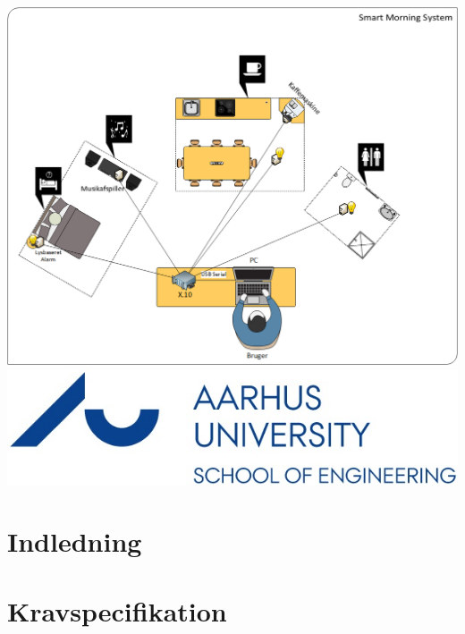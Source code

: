 \documentclass[11pt]{article}
\begin{document}
\begin{titlepage}
\includegraphics[scale=0.6]{projektillustration.png}\\[0.6cm]
\includegraphics[scale=0.25]{forsidelogo.jpg}\\[1cm] %
\vfill %

\end{titlepage}

\tableofcontents
\vfill
\pagebreak

\section{Indledning}
\vfill
\pagebreak

\section{Kravspecifikation}
\vfill
\pagebreak
\end{document}
